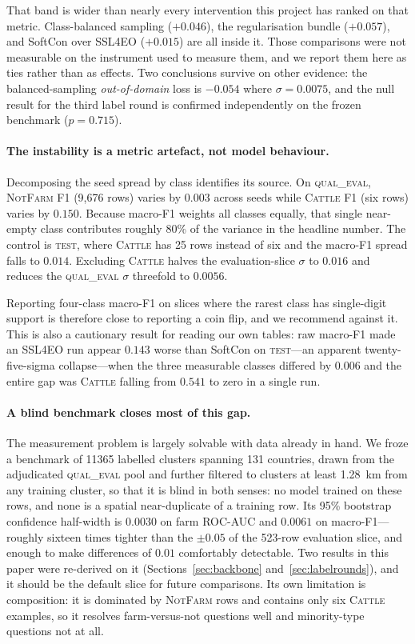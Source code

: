 \documentclass[11pt,a4paper]{article}
\begin{document}
That band is wider than nearly every intervention this project has ranked on that
metric. Class-balanced sampling ($+0.046$), the regularisation bundle
($+0.057$), and SoftCon over SSL4EO ($+0.015$) are all inside it. Those
comparisons were not measurable on the instrument used to measure them, and we
report them here as ties rather than as effects. Two conclusions survive on other
evidence: the balanced-sampling \emph{out-of-domain} loss is $-0.054$ where
$\sigma = 0.0075$, and the null result for the third label round is confirmed
independently on the frozen benchmark ($p = 0.715$).

\paragraph{The instability is a metric artefact, not model behaviour.}
Decomposing the seed spread by class identifies its source. On
\textsc{qual\_eval}, \textsc{NotFarm} F1 (9,676 rows) varies by $0.003$ across
seeds while \textsc{Cattle} F1 (six rows) varies by $0.150$. Because macro-F1
weights all classes equally, that single near-empty class contributes roughly
80\% of the variance in the headline number. The control is \textsc{test}, where
\textsc{Cattle} has 25 rows instead of six and the macro-F1 spread falls to
$0.014$. Excluding \textsc{Cattle} halves the evaluation-slice $\sigma$ to
$0.016$ and reduces the \textsc{qual\_eval} $\sigma$ threefold to $0.0056$.

Reporting four-class macro-F1 on slices where the rarest class has single-digit
support is therefore close to reporting a coin flip, and we recommend against it.
This is also a cautionary result for reading our own tables: raw macro-F1 made an
SSL4EO run appear $0.143$ worse than SoftCon on \textsc{test}---an apparent
twenty-five-sigma collapse---when the three measurable classes differed by
$0.006$ and the entire gap was \textsc{Cattle} falling from $0.541$ to zero in a
single run.

\paragraph{A blind benchmark closes most of this gap.} The measurement problem is
largely solvable with data already in hand. We froze a benchmark of \num{11365}
labelled clusters spanning 131 countries, drawn from the adjudicated
\textsc{qual\_eval} pool and further filtered to clusters at least
\SI{1.28}{\kilo\metre} from any training cluster, so that it is blind in both
senses: no model trained on these rows, and none is a spatial near-duplicate of a
training row. Its 95\% bootstrap confidence half-width is $0.0030$ on farm
ROC-AUC and $0.0061$ on macro-F1---roughly sixteen times tighter than the
$\pm0.05$ of the 523-row evaluation slice, and enough to make differences of
$0.01$ comfortably detectable. Two results in this paper were re-derived on it
(Sections~\ref{sec:backbone} and~\ref{sec:labelrounds}), and it should be the
default slice for future comparisons. Its own limitation is composition: it is
dominated by \textsc{NotFarm} rows and contains only six \textsc{Cattle}
examples, so it resolves farm-versus-not questions well and minority-type
questions not at all.
\end{document}

